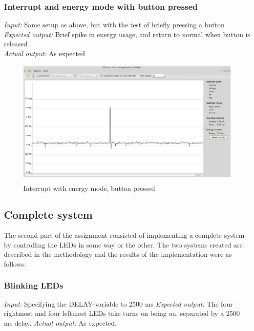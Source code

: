 	\subsubsection{Interrupt and energy mode with button pressed}
	\emph{Input: } Same setup as above, but with the test of briefly pressing a button \\
	\emph{Expected output: } Brief spike in energy usage, and return to normal when button is released \\
	\emph{Actual output: } As expected
	
	\begin{center}
		\begin{figure}[H]
			\includegraphics[width=\textwidth]{fig/interruptAndButton.png}	
			\caption{Interrupt with energy mode, button pressed }	
		\end{figure}
	\end{center}	
	
\subsection{Complete system}

The second part of the assignment consisted of implementing a complete system by controlling the LEDs in some way or the other. The two systems created are described in the methodology and the results of the implementation were as follows:

\subsubsection{Blinking LEDs}

\emph{Input: } Specifying the DELAY-variable to 2500 ms
\emph{Expected output: } The four rightmost and four leftmost LEDs take turns on being on, separated by a 2500 ms delay.
\emph{Actual output: } As expected.

